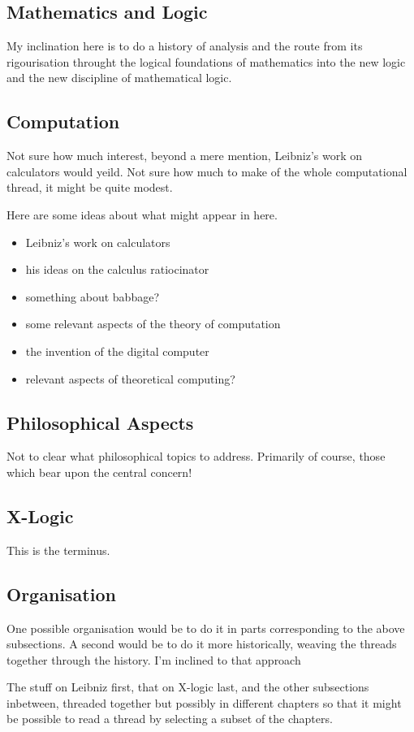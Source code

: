 \documentclass{rbjk}
\begin{document}
\begin{article}
\subsection{Mathematics and Logic}

My inclination here is to do a history of analysis and the route from its rigourisation throught the logical foundations of mathematics into the new logic and the new discipline of mathematical logic.


\subsection{Computation}

Not sure how much interest, beyond a mere mention, Leibniz's work on calculators would yeild.
Not sure how much to make of the whole computational thread, it might be quite modest.

Here are some ideas about what might appear in here.

\begin{itemize}
\item Leibniz's work on calculators
\item his ideas on the calculus ratiocinator
\item something about babbage?
\item some relevant aspects of the theory of computation
\item the invention of the digital computer
\item relevant aspects of theoretical computing?
\end{itemize}

\subsection{Philosophical Aspects}

Not to clear what philosophical topics to address.
Primarily of course, those which bear upon the central concern!

\subsection{X-Logic}

This is the terminus.

\subsection{Organisation}

One possible organisation would be to do it in parts corresponding to the above subsections.
A second would be to do it more historically, weaving the threads together through the history.
I'm inclined to that approach

The stuff on Leibniz first, that on  X-logic last, and the other subsections inbetween, threaded together but possibly in different chapters so that it might be possible to read a thread by selecting a subset of the chapters.

%
%

\end{article}
\end{document}
